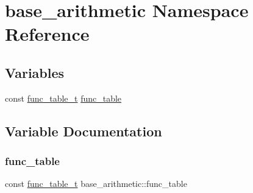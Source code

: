 \hypertarget{namespacebase__arithmetic}{}\section{base\+\_\+arithmetic Namespace Reference}
\label{namespacebase__arithmetic}
\subsection*{Variables}
\begin{DoxyCompactItemize}
\item 
const \mbox{\hyperlink{func__table__t_8hpp_af845869dd1e42c662a4b4f00d1fc528d}{func\+\_\+table\+\_\+t}} \mbox{\hyperlink{namespacebase__arithmetic_a3b46aafb8a45dd810dcf047013742190}{func\+\_\+table}}
\end{DoxyCompactItemize}


\subsection{Variable Documentation}
\mbox{\label{namespacebase__arithmetic_a3b46aafb8a45dd810dcf047013742190}} 
\subsubsection{\texorpdfstring{func\+\_\+table}{func\_table}}
{\footnotesize\ttfamily const \mbox{\hyperlink{func__table__t_8hpp_af845869dd1e42c662a4b4f00d1fc528d}{func\+\_\+table\+\_\+t}} base\+\_\+arithmetic\+::func\+\_\+table}

